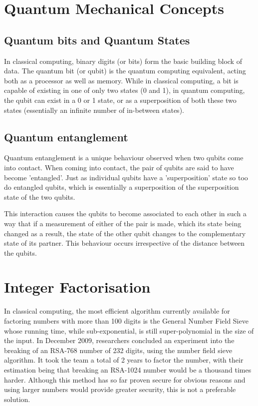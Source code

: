 \documentclass[runningheads,a4paper]{llncs}
\begin{document}
\section{Quantum Mechanical Concepts}

\subsection{Quantum bits and Quantum States}

In classical computing, binary digits (or bits) form the basic building block of data. The quantum bit (or qubit) is the quantum computing equivalent, acting both as a processor as well as memory. While in classical computing, a bit is capable of existing in one of only two states (0 and 1), in quantum computing, the qubit can exist in a 0 or 1 state, or as a superposition of both these two states (essentially an infinite number of in-between states). 

\subsection{Quantum entanglement}

Quantum entanglement is a unique behaviour observed when two qubits come into contact. When coming into contact, the pair of qubits are said to have become 'entangled'. Just as individual qubits have a 'superposition' state so too do entangled qubits, which is essentially a superposition of the superposition state of the two qubits.

This interaction causes the qubits to become associated to each other in such a way that if a measurement of either of the pair is made, which its state being changed as a result, the state of the other qubit changes to the complementary state of its partner. This behaviour occurs irrespective of the distance between the qubits.

\section{Integer Factorisation}

In classical computing, the most efficient algorithm currently available for factoring numbers with more than 100 digits is the General Number Field Sieve whose running time, while sub-exponential, is still super-polynomial in the size of the input. In December 2009, researchers concluded an experiment into the breaking of an RSA-768 number of 232 digits, using the number field sieve algorithm. It took the team a total of 2 years to factor the number, with their estimation being that breaking an RSA-1024 number would be a thousand times harder\cite{Kleinjung:2010:FRM:1881412.1881436}. Although this method has so far proven secure for obvious reasons and using larger numbers would provide greater security, this is not a preferable solution. 
\end{document}
